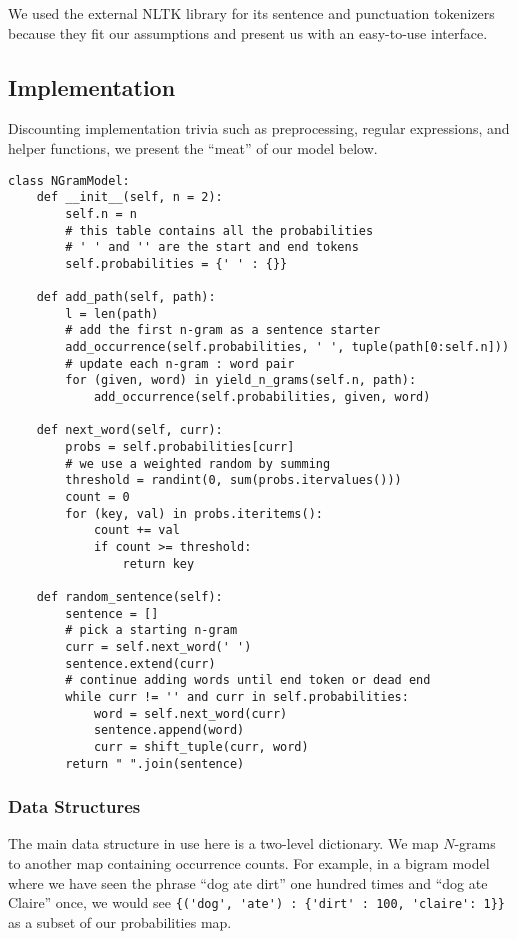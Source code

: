 \documentclass[12pt]{article}
\begin{document}
We used the external NLTK library \cite{NLTK}for its sentence and punctuation tokenizers because they fit our assumptions and present us with an easy-to-use interface.

\subsection{Implementation}
Discounting implementation trivia such as preprocessing, regular expressions, and helper functions, we present the ``meat'' of our model below.
\begin{lstlisting}
class NGramModel:
	def __init__(self, n = 2):
		self.n = n
		# this table contains all the probabilities
		# ' ' and '' are the start and end tokens
		self.probabilities = {' ' : {}}

	def add_path(self, path):
		l = len(path)
		# add the first n-gram as a sentence starter
		add_occurrence(self.probabilities, ' ', tuple(path[0:self.n]))
		# update each n-gram : word pair
		for (given, word) in yield_n_grams(self.n, path):
			add_occurrence(self.probabilities, given, word)

	def next_word(self, curr):
		probs = self.probabilities[curr]
		# we use a weighted random by summing
		threshold = randint(0, sum(probs.itervalues()))
		count = 0
		for (key, val) in probs.iteritems():
			count += val
			if count >= threshold:
				return key

	def random_sentence(self):
		sentence = []
		# pick a starting n-gram
		curr = self.next_word(' ')
		sentence.extend(curr)
		# continue adding words until end token or dead end
		while curr != '' and curr in self.probabilities:
			word = self.next_word(curr)
			sentence.append(word)
			curr = shift_tuple(curr, word)
		return " ".join(sentence)
\end{lstlisting}

\subsubsection{Data Structures}
The main data structure in use here is a two-level dictionary. We map $N$-grams to another map containing occurrence counts. For example, in a bigram model where we have seen the phrase ``dog ate dirt'' one hundred times and ``dog ate Claire'' once, we would see \verb|{('dog', 'ate') : {'dirt' : 100, 'claire': 1}}| as a subset of our probabilities map.
\end{document}
